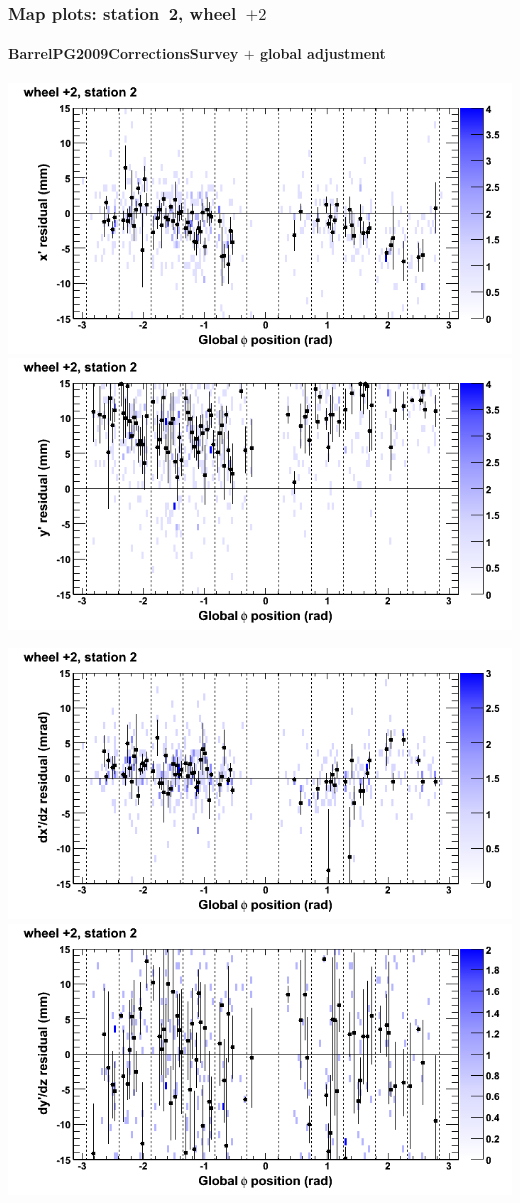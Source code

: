 \documentclass[compress]{beamer}
\begin{document}
\begin{frame}
\frametitle{Map plots: station~2, wheel~$+2$}
\framesubtitle{BarrelPG2009CorrectionsSurvey $+$ global adjustment}
\includegraphics[width=0.5\linewidth]{mapplots_re01/DTvsphi_st2whE_x.png}
\includegraphics[width=0.5\linewidth]{mapplots_re01/DTvsphi_st2whE_y.png}

\includegraphics[width=0.5\linewidth]{mapplots_re01/DTvsphi_st2whE_dxdz.png}
\includegraphics[width=0.5\linewidth]{mapplots_re01/DTvsphi_st2whE_dydz.png}
\end{frame}
\end{document}
